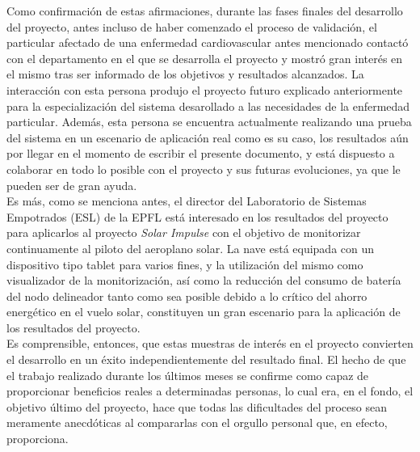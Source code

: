 	Como confirmación de estas afirmaciones, durante las fases finales del desarrollo del proyecto, antes incluso de haber comenzado el proceso de validación, el particular afectado de una enfermedad cardiovascular antes mencionado contactó con el departamento en el que se desarrolla el proyecto y mostró gran interés en el mismo tras ser informado de los objetivos y resultados alcanzados. La interacción con esta persona produjo el proyecto futuro explicado anteriormente para la especialización del sistema desarollado a las necesidades de la enfermedad particular. Además, esta persona se encuentra actualmente realizando una prueba del sistema en un escenario de aplicación real como es su caso, los resultados aún por llegar en el momento de escribir el presente documento, y está dispuesto a colaborar en todo lo posible con el proyecto y sus futuras evoluciones, ya que le pueden ser de gran ayuda.\\

	Es más, como se menciona antes, el director del Laboratorio de Sistemas Empotrados (ESL) de la EPFL está interesado en los resultados del proyecto para aplicarlos al proyecto \emph{Solar Impulse} con el objetivo de monitorizar continuamente al piloto del aeroplano solar. La nave está equipada con un dispositivo tipo tablet para varios fines, y la utilización del mismo como visualizador de la monitorización, así como la reducción del consumo de batería del nodo delineador tanto como sea posible debido a lo crítico del ahorro energético en el vuelo solar, constituyen un gran escenario para la aplicación de los resultados del proyecto.\\

	Es comprensible, entonces, que estas muestras de interés en el proyecto convierten el desarrollo en un éxito independientemente del resultado final. El hecho de que el trabajo realizado durante los últimos meses se confirme como capaz de proporcionar beneficios reales a determinadas personas, lo cual era, en el fondo, el objetivo último del proyecto, hace que todas las dificultades del proceso sean meramente anecdóticas al compararlas con el orgullo personal que, en efecto, proporciona.\\
	
